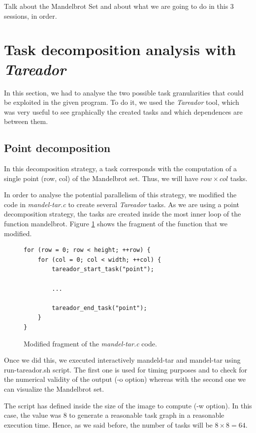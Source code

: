 \documentclass[12pt, a4paper]{article}
\begin{document}
Talk about the Mandelbrot Set and about what we are going to do in this 3 sessions, in order.

\section{Task decomposition analysis with \textit{Tareador}}
\label{sec:tareador}

In this section, we had to analyse the two possible task granularities that could be exploited in the given program. To do it, we used the \textit{Tareador} tool, which was very useful to see graphically the created tasks and which dependences are between them.

\subsection{Point decomposition}

In this decomposition strategy, a task corresponds with the computation of a single point (row, col) of the Mandelbrot set. Thus, we will have $row \times col$ tasks.

In order to analyse the potential parallelism of this strategy, we modified the code in \textit{mandel-tar.c} to create several \textit{Tareador} tasks. As we are using a point decomposition strategy, the tasks are created inside the most inner loop of the function mandelbrot.  Figure \ref{code:mandeltarPoint} shows the fragment of the function that we modified.

\begin{figure}[H]
\begin{lstlisting}
for (row = 0; row < height; ++row) {
	for (col = 0; col < width; ++col) {
		tareador_start_task("point");
		
		...
		
		tareador_end_task("point");
	}
}
\end{lstlisting}
\caption{Modified fragment of the \textit{mandel-tar.c} code.}
\label{code:mandeltarPoint}
\end{figure}

Once we did this, we executed interactively mandeld-tar and mandel-tar using run-tareador.sh script. The first one is used for timing purposes and to check for the numerical validity of the output (-o option) whereas with the second one we can visualize the Mandelbrot set.

The script has defined inside the size of the image to compute (-w option). In this case, the value was 8 to generate a reasonable task graph in a reasonable execution time. Hence, as we said before, the number of tasks will be $8 \times 8 = 64$.
\end{document}
